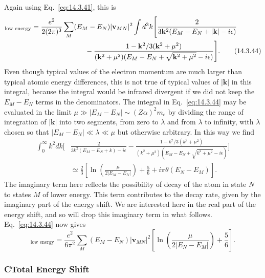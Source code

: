 Again using Eq.~\eqref{eq:14.3.41}, this is
\begin{align}
[\delta E_N]_{\text{low energy}}={}&
\frac{e^2}{2(2\pi)^3}\sum_M(E_M-E_N)|\mathbf v_{MN}|^2
\int d^3k\Biggl[
\frac{2}{3\mathbf k^2(E_M-E_N+|\mathbf k|-i\epsilon)}\notag\\
&\hspace{22mm}-
\frac{1-\mathbf k^2/3(\mathbf k^2+\mu^2)}
{(\mathbf k^2+\mu^2)(E_M-E_N+\sqrt{\mathbf k^2+\mu^2}-i\epsilon)}
\Biggr].
\tag{14.3.44}\label{eq:14.3.44}
\end{align}
Even though typical values of the electron momentum are much larger than
typical atomic energy differences, this is not true of typical values of
$|\mathbf k|$ in this integral, because the integral would be infrared
divergent if we did not keep the $E_M-E_N$ terms in the denominators. The
integral in Eq.~\eqref{eq:14.3.44} may be evaluated in the limit
$\mu\gg|E_M-E_N|\sim(Z\alpha)^2m_e$ by dividing the range of integration of
$|\mathbf k|$ into two segments, from zero to $\lambda$ and from $\lambda$ to
infinity, with $\lambda$ chosen so that $|E_M-E_N|\ll\lambda\ll\mu$ but
otherwise arbitrary. In this way we find
\begin{align*}
\int_0^\infty k^2dk\Biggl[&
\frac{2}{3k^2(E_M-E_N+k)-i\epsilon}
-\frac{1-k^2/3(k^2+\mu^2)}
{(k^2+\mu^2)(E_M-E_N+\sqrt{k^2+\mu^2}-i\epsilon)}\Biggr]\\
&\simeq\frac23\left[\ln\left(\frac{\mu}{2|E_M-E_N|}\right)
+\frac56+i\pi\theta(E_N-E_M)\right].
\end{align*}
The imaginary term here reflects the possibility of decay of the atom in
state $N$ to states $M$ of lower energy. This term contributes to the decay
rate, given by the imaginary part of the energy shift. We are interested here
in the real part of the energy shift, and so will drop this imaginary term in
what follows. Eq.~\eqref{eq:14.3.44} now gives
\begin{equation}
[\delta E_N]_{\text{low energy}}
=\frac{e^2}{6\pi^2}\sum_M(E_M-E_N)|\mathbf v_{MN}|^2
\left[\ln\left(\frac{\mu}{2|E_N-E_M|}\right)+\frac56\right].
\tag{14.3.45}\label{eq:14.3.45}
\end{equation}

\subsubsection*{C\quad Total Energy Shift}

